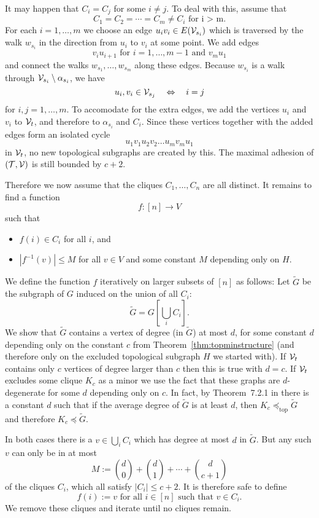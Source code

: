 \documentclass[12pt]{amsart}
\newcommand{\absval}[1]{\left\vert #1 \right\vert}
\newcommand{\topmin}{\preceq_{\mathrm{top}}}
\begin{document}
It may happen that $C_i = C_j$ for some $i \not= j$. To deal with
this, assume that
\[
C_1 = C_2 = \cdots = C_m \not= C_i\text{ for i > m}.
\]
For each $i = 1,\ldots,m$ we choose an edge $u_iv_i \in E(\mathcal{V}_{s_i})$
which is traversed by the walk $w_{s_i}$ in the direction from $u_i$
to $v_i$ at some point. We add edges
\[
v_iu_{i+1}\text{ for }i=1,\ldots,m-1\text{ and }v_mu_1
\]
and connect the walks $w_{s_1},\ldots,w_{s_m}$ along these
edges. Because $w_{s_i}$ is a walk through $\mathcal{V}_{s_i} \setminus
\alpha_{s_i}$, we have
\[
u_i,v_i \in \mathcal{V}_{s_j} \quad\Leftrightarrow\quad i = j
\]
for $i,j = 1,\ldots,m$. To accomodate for the extra edges, we add the
vertices $u_i$ and $v_i$ to $\mathcal{V}_t$, and therefore to $\alpha_{s_i}$
and $C_i$. Since these vertices together with the added edges form an
isolated cycle
\[
u_1v_1u_2v_2\ldots u_mv_mu_1
\]
in $\mathcal{V}_t$, no new topological subgraphs are created by this. The
maximal adhesion of $(\mathcal{T},\mathcal{V})$ is still bounded by $c+2$.

Therefore we now assume that the cliques $C_1,\ldots,C_{n}$ are all
distinct. It remains to find a function
\[
f : [n] \to V
\]
such that
\begin{itemize}
\item $f(i) \in C_i$ for all $i$, and
\item $\absval{f^{-1}(v)} \leq M$ for all $v \in V$ and some constant
  $M$ depending only on $H$.
\end{itemize}

We define the function $f$ iteratively on larger subsets of $[n]$ as
follows: Let $\tilde G$ be the subgraph of $G$ induced on the union of
all $C_i$:
\[
\tilde G = G\left[\bigcup_i C_i\right].
\]
We show that $\tilde G$ contains a vertex of degree (in $\tilde G$) at
most $d$, for some constant $d$ depending only on the constant $c$
from Theorem~\ref{thm:topminstructure} (and therefore only on the
excluded topological subgraph $H$ we started with). If $\mathcal{V}_t$
contains only $c$ vertices of degree larger than $c$ then this is true
with $d = c$. If $\mathcal{V}_t$ excludes some clique $K_c$ as a minor we use
the fact that these graphs are $d$-degenerate for some $d$ depending
only on $c$. In fact, by Theorem~7.2.1 in \cite{diestel} there is a
constant $d$ such that if the average degree of $\tilde G$ is at least
$d$, then $K_c \topmin \tilde G$ and therefore $K_c \preceq \tilde G$.

In both cases there is a $v \in \bigcup_i C_i$ which has degree at
most $d$ in $\tilde G$. But any such $v$ can only be in at most
\[
M := \binom{d}{0} + \binom{d}{1} + \cdots + \binom{d}{c+1}
\]
of the cliques $C_i$, which all satisfy $\absval{C_i} \leq c+2$. It is
therefore safe to define
\[
f(i) := v\text{ for all }i\in [n]\text{ such that }v \in C_i.
\]
We remove these cliques and iterate until no cliques remain.
\end{document}
